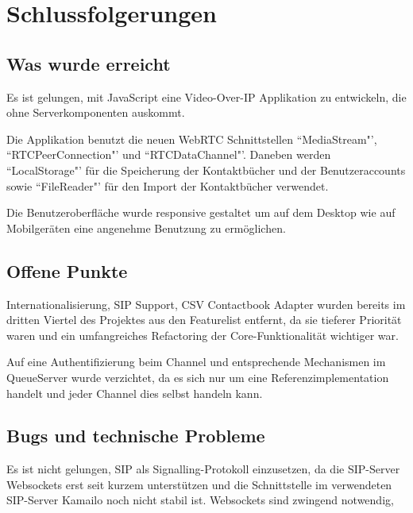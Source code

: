 \chapter{Schlussfolgerungen}
	\section{Was wurde erreicht}
	Es ist gelungen, mit JavaScript eine Video-Over-IP Applikation zu entwickeln, die ohne Serverkomponenten auskommt.
	
	Die Applikation benutzt die neuen WebRTC Schnittstellen ``MediaStream"', ``RTCPeerConnection"' und ``RTCDataChannel"'. Daneben werden ``LocalStorage"' für die Speicherung der Kontaktbücher und der Benutzeraccounts sowie ``FileReader"' für den Import der Kontaktbücher verwendet.
	
	Die Benutzeroberfläche wurde responsive gestaltet um auf dem Desktop wie auf Mobilgeräten eine angenehme Benutzung zu ermöglichen.
	
	
	\section{Offene Punkte}
	Internationalisierung, SIP Support, CSV Contactbook Adapter wurden bereits im dritten Viertel des Projektes aus den Featurelist entfernt, da sie tieferer Priorität waren und ein umfangreiches Refactoring der Core-Funktionalität wichtiger war.
	
	Auf eine Authentifizierung beim Channel und entsprechende Mechanismen im QueueServer wurde verzichtet, da es sich nur um eine Referenzimplementation handelt und jeder Channel dies selbst handeln kann.
	
	
	\section{Bugs und technische Probleme}
	Es ist nicht gelungen, SIP als Signalling-Protokoll einzusetzen, da die SIP-Server Websockets erst seit kurzem unterstützen und die Schnittstelle im verwendeten SIP-Server Kamailo noch nicht stabil ist. Websockets sind zwingend notwendig, 